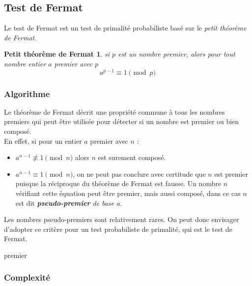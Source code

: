 		\subsection{Test de Fermat}
			Le test de Fermat est un test de primalité probabiliste basé sur le \textit{petit théorème de Fermat}.
			\newtheorem*{Fermat}{Petit théorème de Fermat}
			\vspace{-1.5em}\begin{adjustwidth}{1.5cm}{1.5cm} 
			\begin{Fermat}
				si $p$ est un nombre premier, alors pour tout nombre entier $a$ premier avec $p$
				\[a^{p-1}\equiv 1 \pmod p\]
			\end{Fermat}
			\end{adjustwidth}\vspace{0.5em}
			
			\subsubsection{Algorithme}
				Le théorème de Fermat décrit une propriété commune à tous les nombres premiers qui peut être utilisée pour détecter si un nombre est premier ou bien composé.\\
				En effet, si pour un entier $a$ premier avec $n$ : 
				\begin{itemize}
				\item $a^{n-1} \not\equiv 1 \pmod n$ alors $n$ est surement composé.
				\item $a^{n-1}\equiv 1 \pmod n$, on ne peut pas conclure avec certitude que $n$ est premier puisque la réciproque du théorème de Fermat est fausse. Un nombre $n$ vérifiant cette équation peut être premier, mais aussi composé, dans ce cas $n$ est dit \textit{\textbf{pseudo-premier} de base $a$}.
				\end{itemize}
				Les nombres pseudo-premiers sont relativement rares. On peut donc envisager d'adopter ce critère pour un test probabiliste de primalité, qui est le test de Fermat.
				
				\begin{algorithm}
					\caption{Test de Fermat\label{TF}}
				\Retour premier\;
				\end{algorithm}
		
			\subsubsection{Complexité}
